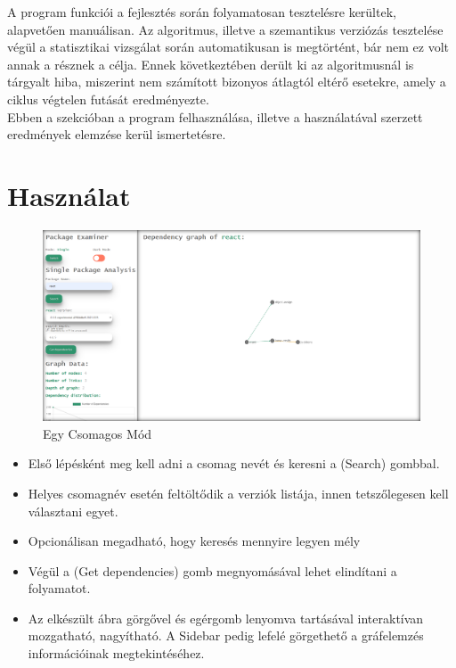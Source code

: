 
A program funkciói a fejlesztés során folyamatosan tesztelésre kerültek, alapvetően manuálisan. Az algoritmus, illetve a szemantikus verziózás tesztelése végül a statisztikai vizsgálat során automatikusan is megtörtént, bár nem ez volt annak a résznek a célja. Ennek következtében derült ki az algoritmusnál is tárgyalt hiba, miszerint nem számított bizonyos átlagtól eltérő esetekre, amely a ciklus végtelen futását eredményezte.\\

Ebben a szekcióban a program felhasználása, illetve a használatával szerzett eredmények elemzése kerül ismertetésre.

\section{Használat}

\begin{figure}[!h]
	\centering
	\includegraphics[scale=0.2]{images/examiner.png}
	\caption{Egy Csomagos Mód}
	\label{fig:examiner}
\end{figure}

\begin{itemize}
	\item Első lépésként meg kell adni a csomag nevét és keresni a (Search) gombbal.
	\item Helyes csomagnév esetén feltöltődik a verziók listája, innen tetszőlegesen kell választani egyet.
	\item Opcionálisan megadható, hogy keresés mennyire legyen mély
	\item Végül a (Get dependencies) gomb megnyomásával lehet elindítani a folyamatot.
	\item Az elkészült ábra görgővel és egérgomb lenyomva tartásával interaktívan mozgatható, nagyítható. A Sidebar pedig lefelé görgethető a gráfelemzés információinak megtekintéséhez.
\end{itemize}

